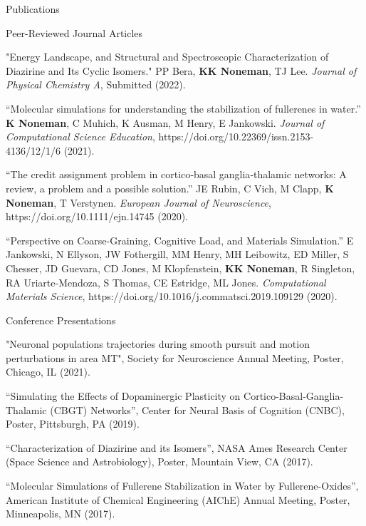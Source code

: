 \documentclass{resume} %
\begin{document}
\newpage
\begin{rSection}{Publications}
\begin{rSubsection4}{Peer-Reviewed Journal Articles}{}{}{}
\item "Energy Landscape, and Structural and Spectroscopic Characterization of Diazirine and Its Cyclic Isomers." PP Bera, \textbf{KK Noneman}, TJ Lee. \textit{Journal of Physical Chemistry A}, Submitted (2022).
\item “Molecular simulations for understanding the stabilization of fullerenes in water.” \textbf{K Noneman}, C Muhich, K Ausman, M Henry, E Jankowski. \textit{Journal of Computational Science Education}, https://doi.org/10.22369/issn.2153-4136/12/1/6 (2021).
\item “The credit assignment problem in cortico‐basal ganglia‐thalamic networks: A review, a problem and a possible solution.” JE Rubin, C Vich, M Clapp, \textbf{K Noneman}, T Verstynen. \textit{European Journal of Neuroscience}, https://doi.org/10.1111/ejn.14745 (2020).
\item “Perspective on Coarse-Graining, Cognitive Load, and Materials Simulation.” E Jankowski, N Ellyson, JW Fothergill, MM Henry, MH Leibowitz, ED Miller, S Chesser, JD Guevara, CD Jones, M Klopfenstein, \textbf{KK Noneman}, R Singleton, RA Uriarte-Mendoza, S Thomas, CE Estridge, ML Jones. \textit{Computational Materials Science}, https://doi.org/10.1016/j.commatsci.2019.109129 (2020).
\end{rSubsection4}
    
\begin{rSubsection4}{Conference Presentations}{}{}{}
\item "Neuronal populations trajectories during smooth pursuit and motion perturbations in area MT", Society for Neuroscience Annual Meeting, Poster, Chicago, IL (2021). 
\item “Simulating the Effects of Dopaminergic Plasticity on Cortico-Basal-Ganglia-Thalamic (CBGT) Networks”, Center for Neural Basis of Cognition (CNBC), Poster, Pittsburgh, PA (2019).
\item “Characterization of Diazirine and its Isomers”, NASA Ames Research Center (Space Science and Astrobiology), Poster, Mountain View, CA (2017).
\item “Molecular Simulations of Fullerene Stabilization in Water by Fullerene-Oxides”, American Institute of Chemical Engineering (AIChE) Annual Meeting, Poster, Minneapolis, MN (2017).
\end{rSubsection4}
\end{rSection}
\end{document}
